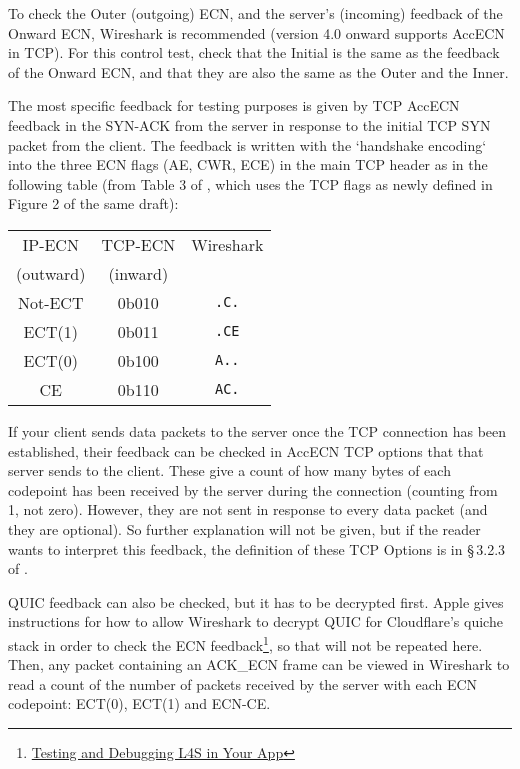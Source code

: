To check the Outer (outgoing) ECN, and the server's (incoming) feedback of the Onward ECN, Wireshark is recommended (version 4.0 onward supports AccECN in TCP). For this control test, check that the Initial is the same as the feedback of the Onward ECN, and that they are also the same as the Outer and the Inner.

The most specific feedback for testing purposes is given by TCP AccECN feedback in the SYN-ACK from the server in response to the initial TCP SYN packet from the client. The feedback is written with the `handshake encoding` into the three ECN flags (AE, CWR, ECE) in the main TCP header as in the following table (from Table 3 of \cite{Briscoe14d:accecn_ID}, which uses the TCP flags as newly defined in Figure 2 of the same draft):

{\centering
\begin{tabular}{ccc}
	IP-ECN    & TCP-ECN  & Wireshark\\
	(outward) & (inward) &\\
	\hline%
	Not-ECT   & 0b010    & \texttt{.C.}\\
	ECT(1)    & 0b011    & \texttt{.CE}\\
	ECT(0)    & 0b100    & \texttt{A..}\\
	CE        & 0b110    & \texttt{AC.}\\
	\hline
\end{tabular}
\par}

If your client sends data packets to the server once the TCP connection has been established, their feedback can be checked in AccECN TCP options that that server sends to the client. These give a count of how many bytes of each codepoint has been received by the server during the connection (counting from 1, not zero). However, they are not sent in response to every data packet (and they are optional). So further explanation will not be given, but if the reader wants to interpret this feedback, the definition of these TCP Options is in \S\,3.2.3 of \cite{Briscoe14d:accecn_ID}.

QUIC feedback can also be checked, but it has to be decrypted first. Apple gives instructions for how to allow Wireshark to decrypt QUIC for Cloudflare's quiche stack in order to check the ECN  feedback\footnote{\href{https://developer.apple.com/documentation/network/testing_and_debugging_l4s_in_your_app}{Testing and Debugging L4S in Your App}}, so that will not be repeated here. Then, any packet containing an ACK\_ECN frame can be viewed in Wireshark to read a count of the number of packets received by the server with each ECN codepoint: ECT(0), ECT(1) and ECN-CE.

